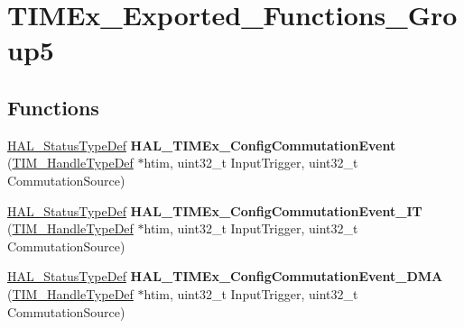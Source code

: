 \hypertarget{group___t_i_m_ex___exported___functions___group5}{}\section{T\+I\+M\+Ex\+\_\+\+Exported\+\_\+\+Functions\+\_\+\+Group5}
\label{group___t_i_m_ex___exported___functions___group5}
\subsection*{Functions}
\begin{DoxyCompactItemize}
\item 
\mbox{\label{group___t_i_m_ex___exported___functions___group5_ga0870c20c0412896f6321f71ede9e5a3d}} 
\hyperlink{stm32f0xx__hal__def_8h_a63c0679d1cb8b8c684fbb0632743478f}{H\+A\+L\+\_\+\+Status\+Type\+Def} {\bfseries H\+A\+L\+\_\+\+T\+I\+M\+Ex\+\_\+\+Config\+Commutation\+Event} (\hyperlink{struct_t_i_m___handle_type_def}{T\+I\+M\+\_\+\+Handle\+Type\+Def} $\ast$htim, uint32\+\_\+t Input\+Trigger, uint32\+\_\+t Commutation\+Source)
\item 
\mbox{\label{group___t_i_m_ex___exported___functions___group5_ga2a50ed8d310449f6535c6627da26ed35}} 
\hyperlink{stm32f0xx__hal__def_8h_a63c0679d1cb8b8c684fbb0632743478f}{H\+A\+L\+\_\+\+Status\+Type\+Def} {\bfseries H\+A\+L\+\_\+\+T\+I\+M\+Ex\+\_\+\+Config\+Commutation\+Event\+\_\+\+IT} (\hyperlink{struct_t_i_m___handle_type_def}{T\+I\+M\+\_\+\+Handle\+Type\+Def} $\ast$htim, uint32\+\_\+t Input\+Trigger, uint32\+\_\+t Commutation\+Source)
\item 
\mbox{\label{group___t_i_m_ex___exported___functions___group5_gac821ce78d607cca00a5f06496beed76e}} 
\hyperlink{stm32f0xx__hal__def_8h_a63c0679d1cb8b8c684fbb0632743478f}{H\+A\+L\+\_\+\+Status\+Type\+Def} {\bfseries H\+A\+L\+\_\+\+T\+I\+M\+Ex\+\_\+\+Config\+Commutation\+Event\+\_\+\+D\+MA} (\hyperlink{struct_t_i_m___handle_type_def}{T\+I\+M\+\_\+\+Handle\+Type\+Def} $\ast$htim, uint32\+\_\+t Input\+Trigger, uint32\+\_\+t Commutation\+Source)
\item 
\mbox{\label{group___t_i_m_ex___exported___functions___group5_ga056fd97d3be6c60dcfa12963f6ec8aad}} 

\end{DoxyCompactItemize}
